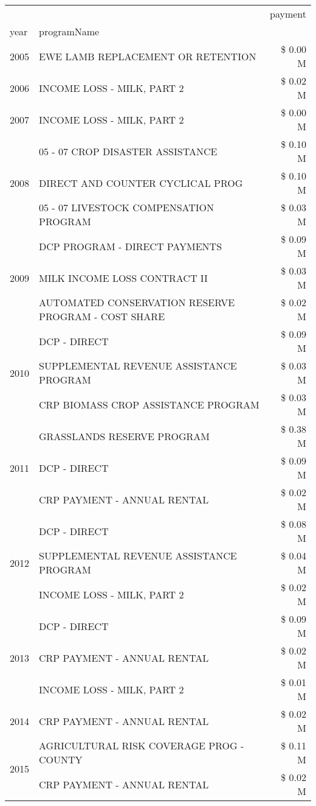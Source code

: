\begin{tabular}{llr}
\toprule
 &  & payment \\
year & programName &  \\
\midrule
2005 & EWE LAMB REPLACEMENT OR RETENTION & \$ 0.00 M \\
\cline{1-3}
2006 & INCOME LOSS - MILK, PART 2 & \$ 0.02 M \\
\cline{1-3}
2007 & INCOME LOSS - MILK, PART 2 & \$ 0.00 M \\
\cline{1-3}
\multirow[t]{3}{*}{2008} & 05 - 07 CROP DISASTER ASSISTANCE & \$ 0.10 M \\
 & DIRECT AND COUNTER CYCLICAL PROG & \$ 0.10 M \\
 & 05 - 07 LIVESTOCK COMPENSATION PROGRAM & \$ 0.03 M \\
\cline{1-3}
\multirow[t]{3}{*}{2009} & DCP PROGRAM - DIRECT PAYMENTS & \$ 0.09 M \\
 & MILK INCOME LOSS CONTRACT II & \$ 0.03 M \\
 & AUTOMATED CONSERVATION RESERVE PROGRAM - COST SHARE & \$ 0.02 M \\
\cline{1-3}
\multirow[t]{3}{*}{2010} & DCP - DIRECT & \$ 0.09 M \\
 & SUPPLEMENTAL REVENUE ASSISTANCE PROGRAM & \$ 0.03 M \\
 & CRP BIOMASS CROP ASSISTANCE PROGRAM & \$ 0.03 M \\
\cline{1-3}
\multirow[t]{3}{*}{2011} & GRASSLANDS RESERVE PROGRAM & \$ 0.38 M \\
 & DCP - DIRECT & \$ 0.09 M \\
 & CRP PAYMENT - ANNUAL RENTAL & \$ 0.02 M \\
\cline{1-3}
\multirow[t]{3}{*}{2012} & DCP - DIRECT & \$ 0.08 M \\
 & SUPPLEMENTAL REVENUE ASSISTANCE PROGRAM & \$ 0.04 M \\
 & INCOME LOSS - MILK, PART 2 & \$ 0.02 M \\
\cline{1-3}
\multirow[t]{3}{*}{2013} & DCP - DIRECT & \$ 0.09 M \\
 & CRP PAYMENT - ANNUAL RENTAL & \$ 0.02 M \\
 & INCOME LOSS - MILK, PART 2 & \$ 0.01 M \\
\cline{1-3}
2014 & CRP PAYMENT - ANNUAL RENTAL & \$ 0.02 M \\
\cline{1-3}
\multirow[t]{3}{*}{2015} & AGRICULTURAL RISK COVERAGE PROG - COUNTY & \$ 0.11 M \\
 & CRP PAYMENT - ANNUAL RENTAL & \$ 0.02 M \\

\end{tabular}
